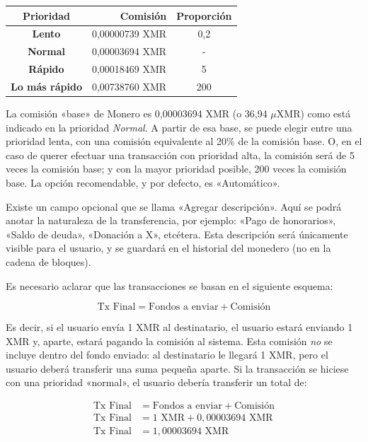 \documentclass[12pt,a4paper,twoside]{book}
\begin{document}
\begin{tabular}{|c|r|c|}
\hline
\textbf{Prioridad} & \textbf{Comisión} & \textbf{Proporción} \\
\hline
\textbf{Lento} & 0,00000739 XMR & 0,2 \\
\hline
\textbf{Normal} & 0,00003694 XMR & - \\
\hline
\textbf{Rápido} & 0,00018469 XMR & 5 \\
\hline
\textbf{Lo más rápido} & 0,00738760 XMR & 200 \\
\hline
\end{tabular}

La comisión «base» de Monero es 0,00003694 XMR (o 36,94 $ \mu $XMR) como está indicado en la prioridad \textit{Normal}. A partir de esa base, se puede elegir entre una prioridad lenta, con una comisión equivalente al 20\% de la comisión base. O, en el caso de querer efectuar una transacción con prioridad alta, la comisión será de 5 veces la comisión base; y con la mayor prioridad posible, 200 veces la comisión base. La opción recomendable, y por defecto, es «Automático».

Existe un campo opcional que se llama «Agregar descripción». Aquí se podrá anotar la naturaleza de la transferencia, por ejemplo: «Pago de honorarios», «Saldo de deuda», «Donación a X», etcétera. Esta descripción será únicamente visible para el usuario, y se guardará en el historial del monedero (no en la cadena de bloques).

Es necesario aclarar que las transacciones se basan en el siguiente esquema:

\[
\text{Tx Final} = \text{Fondos a enviar} + \text{Comisión}
\]

Es decir, si el usuario envía 1 XMR al destinatario, el usuario estará enviando 1 XMR y, aparte, estará pagando la comisión al sistema. Esta comisión \textit{no} se incluye dentro del fondo enviado: al destinatario le llegará 1 XMR, pero el usuario deberá transferir una suma pequeña aparte. Si la transacción se hiciese con una prioridad «normal», el usuario debería transferir un total de:

\begin{align*}
\text{Tx Final} &= \text{Fondos a enviar} + \text{Comisión} \\
\text{Tx Final} &= 1 \text{ XMR} + 0,00003694 \text{ XMR} \\
\text{Tx Final} &= 1,00003694 \text{ XMR} \\
\end{align*}
\end{document}
